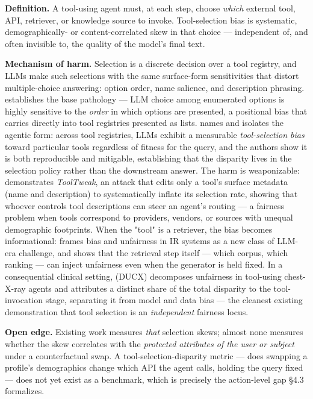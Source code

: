 \documentclass[sigconf,nonacm]{acmart}
\begin{document}
\textbf{Definition.} A tool-using agent must, at each step, choose \emph{which} external tool, API, retriever, or knowledge source to invoke. Tool-selection bias is systematic, demographically- or content-correlated skew in that choice — independent of, and often invisible to, the quality of the model's final text.

\textbf{Mechanism of harm.} Selection is a discrete decision over a tool registry, and LLMs make such selections with the same surface-form sensitivities that distort multiple-choice answering: option order, name salience, and description phrasing. \cite{pezeshkpour2023large} establishes the base pathology — LLM choice among enumerated options is highly sensitive to the \emph{order} in which options are presented, a positional bias that carries directly into tool registries presented as lists. \cite{blankenstein2025biasbusters} names and isolates the agentic form: across tool registries, LLMs exhibit a measurable \emph{tool-selection bias} toward particular tools regardless of fitness for the query, and the authors show it is both reproducible and mitigable, establishing that the disparity lives in the selection policy rather than the downstream answer. The harm is weaponizable: \cite{sneh2025tooltweak} demonstrates \emph{ToolTweak}, an attack that edits only a tool's surface metadata (name and description) to systematically inflate its selection rate, showing that whoever controls tool descriptions can steer an agent's routing — a fairness problem when tools correspond to providers, vendors, or sources with unequal demographic footprints. When the "tool" is a retriever, the bias becomes informational: \cite{dai2024bias} frames bias and unfairness in IR systems as a new class of LLM-era challenge, and \cite{wu2024rag} shows that the retrieval step itself — which corpus, which ranking — can inject unfairness even when the generator is held fixed. In a consequential clinical setting, \cite{xu2026ducx} (DUCX) decomposes unfairness in tool-using chest-X-ray agents and attributes a distinct share of the total disparity to the tool-invocation stage, separating it from model and data bias — the cleanest existing demonstration that tool selection is an \emph{independent} fairness locus.

\textbf{Open edge.} Existing work measures \emph{that} selection skews; almost none measures whether the skew correlates with the \emph{protected attributes of the user or subject} under a counterfactual swap. A tool-selection-disparity metric — does swapping a profile's demographics change which API the agent calls, holding the query fixed — does not yet exist as a benchmark, which is precisely the action-level gap §4.3 formalizes.
\end{document}
